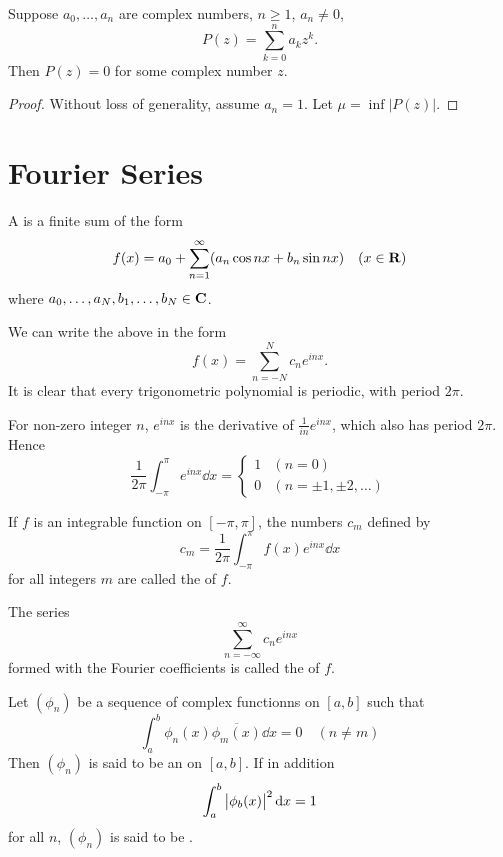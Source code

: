 \begin{theorem}
Suppose $a_0,\dots,a_n$ are complex numbers, $n\ge1$, $a_n\neq0$,
\[P(z)=\sum_{k=0}^n a_kz^k.\]
Then $P(z)=0$ for some complex number $z$.
\end{theorem}

\begin{proof}
Without loss of generality, assume $a_n=1$. Let $\mu=\inf|P(z)|$.
\end{proof}

\section{Fourier Series}
\begin{definition}
A  is a finite sum of the form
\[f(x)=a_0+\sum_{n=1}^\infty(a_n\cos nx+b_n\sin nx)\quad(x\in\mathbf R)\]
where $a_0,\dots,a_N,b_1,\dots,b_N\in\mathbf C$.
\end{definition}

We can write the above in the form
\[f(x)=\sum_{n=-N}^N c_ne^{inx}.\]
It is clear that every trigonometric polynomial is periodic, with period $2\pi$.

For non-zero integer $n$, $e^{inx}$ is the derivative of $\frac{1}{in}e^{inx}$, which also has period $2\pi$. Hence
\[\frac{1}{2\pi}\int_{-\pi}^{\pi}e^{inx}\dd{x}=\begin{cases}
1&(n=0)\\
0&(n=\pm1,\pm2,\dots)
\end{cases}\]

\begin{definition}
If $f$ is an integrable function on $[-\pi,\pi]$, the numbers $c_m$ defined by
\[c_m=\frac{1}{2\pi}\int_{-\pi}^{\pi}f(x)e^{inx}\dd{x}\]
for all integers $m$ are called the  of $f$.
\end{definition}

\begin{definition}
The series
\[\sum_{n=-\infty}^{\infty}c_ne^{inx}\]
formed with the Fourier coefficients is called the  of $f$.
\end{definition}

\begin{definition}
Let $(\phi_n)$ be a sequence of complex functionns on $[a,b]$ such that
\[\int_{a}^{b}\phi_n(x)\overline{\phi_m(x)}\dd{x}=0\quad(n\neq m)\]
Then $(\phi_n)$ is said to be an  on $[a,b]$. If in addition
\[\int_{a}^{b}\left|\phi_b(x)\right|^2\dd{x}=1\]
for all $n$, $(\phi_n)$ is said to be .
\end{definition}

